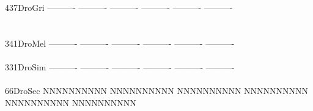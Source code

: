 \documentclass[11pt,twoside,reqno,a4paper]{article}
\begin{document}
{437\hspace*{1\charwidth}DroGri	----------	----------	----------	----------	----------	----------	\\
\hspace*{4\charwidth}\hspace*{7\charwidth}\hspace*{1\charwidth}\hspace*{1\charwidth}\hspace*{1\charwidth}\hspace*{1\charwidth}\hspace*{1\charwidth}\hspace*{1\charwidth}\\
\\
341\hspace*{1\charwidth}DroMel	----------	----------	----------	----------	----------	----------	\\
\hspace*{4\charwidth}\hspace*{7\charwidth}\hspace*{1\charwidth}\hspace*{1\charwidth}\hspace*{1\charwidth}\hspace*{1\charwidth}\hspace*{1\charwidth}\hspace*{1\charwidth}\\
331\hspace*{1\charwidth}DroSim	----------	----------	----------	----------	----------	----------	\\
\hspace*{4\charwidth}\hspace*{7\charwidth}\hspace*{1\charwidth}\hspace*{1\charwidth}\hspace*{1\charwidth}\hspace*{1\charwidth}\hspace*{1\charwidth}\hspace*{1\charwidth}\\
66\hspace*{2\charwidth}DroSec	NNNNNNNNNN	NNNNNNNNNN	NNNNNNNNNN	NNNNNNNNNN	NNNNNNNNNN	NNNNNNNNNN	\\
\hspace*{4\charwidth}\hspace*{7\charwidth}\hspace*{1\charwidth}\hspace*{1\charwidth}\hspace*{1\charwidth}\hspace*{1\charwidth}\hspace*{1\charwidth}\hspace*{1\charwidth}\\
}
\end{document}
